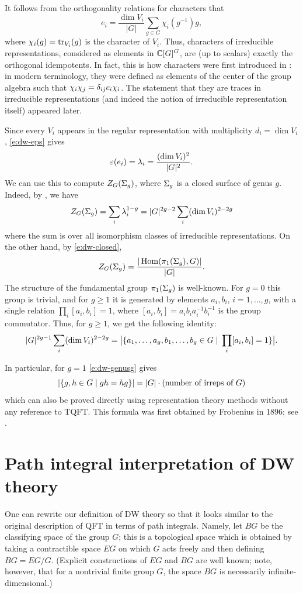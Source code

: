 \begin{remark}\label{r:characters}
  It follows from the orthogonality relations for characters that
  $$
    e_i =\frac{\dim V_i}{|G|} \sum_{g\in G}\chi_i(g^{-1})g,
  $$
  where $\chi_i(g)=\operatorname{tr}_{V_i}(g)$ is the character of $V_i$. Thus, characters of
  irreducible representations, considered as elements in $\mathbb{C}[G]^G$, are (up to
  scalars) exactly the orthogonal idempotents. In fact, this is how characters
  were first introduced in \cite{frobenius-characters}: in modern terminology,
  they were defined as elements of the center of the group algebra such that
  $\chi_i\chi_j = \delta_{ij}c_i\chi_i$. The statement that they are traces in
  irreducible representations (and indeed the notion of irreducible
  representation itself) appeared later.
\end{remark}

Since every $V_i$ appears in the regular representation with
multiplicity $d_i=\dim V_i$, \eqref{e:dw-eps} gives
$$
  \varepsilon(e_i) = \lambda_i = \frac{(\dim V_i)^2}{|G|^2}.
$$
We can use this to compute $Z_G(\Sigma_g)$, where $\Sigma_g$ is a closed
surface of genus $g$. Indeed, by , we have
$$
  Z_G(\Sigma_g)= \sum_i \lambda_i^{1-g} = |G|^{2g-2} \sum_i (\dim V_i)^{2-2g}
$$
where the sum is over all isomorphism classes of irreducible representations.
On the other hand, by \eqref{e:dw-closed},
$$
  Z_G(\Sigma_g) =\frac{|\operatorname{Hom}(\pi_1(\Sigma_g), G)|}{|G|}.
$$
The structure of the fundamental group $\pi_1(\Sigma_g)$ is well-known. For
$g=0$ this group is trivial, and for $g\ge 1$ it is generated by elements
$a_i, b_i$, $i=1, \dots, g$, with a single relation $\prod_i [a_i,b_i]=1$,
where $[a_i,b_i] = a_ib_ia_i^{-1}b_i^{-1}$ is the group commutator. Thus,
for $g\ge 1$, we get the following identity:
\begin{equation}\label{e:dw-genusg}
  |G|^{2g-1} \sum_i (\dim V_i)^{2-2g}
  =\bigl|
    \{a_1, \dots, a_g, b_1, \dots, b_g\in G\; | \; \prod_i [a_i,b_i]=1\}
    \bigr|.
\end{equation}

In particular, for $g=1$ \eqref{e:dw-genusg} gives
$$
  |\{g,h\in G\; | \; gh=hg\}|=|G|\cdot (\text{number of irreps of $G$})
$$
which can also be proved directly using representation theory methods without
any reference to TQFT. This formula was first obtained by Frobenius in 1896;
see \cite{frobenius-characters}.

\section{Path integral interpretation of DW theory}\label{s:DW-path-integral}
One can rewrite our definition of DW theory so that it looks similar to the
original description of QFT in terms of path integrals. Namely, let $BG$
be the classifying space of the group $G$; this is a topological space which
is obtained by taking a contractible space $EG$ on which $G$ acts freely and
then defining $BG=EG/G$. (Explicit constructions of $EG$ and $BG$ are
well known; note, however, that for a nontrivial finite group $G$, the space
$BG$ is necessarily infinite-dimensional.)

